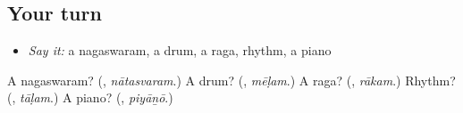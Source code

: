 \subsection*{Your turn}
\begin{itemize}
\raggedright
  \item \emph{Say it:} a nagaswaram, a drum, a raga, rhythm, a piano
\end{itemize}

\begin{tcolorbox}[breakable,colback=teal!4,colframe=teal!35!black,title={Before you move on}]
A nagaswaram? (\textbf{}, \emph{nātasvaram}.) A drum? (\textbf{}, \emph{mēḷam}.) A raga? (\textbf{}, \emph{rākam}.) Rhythm? (\textbf{}, \emph{tāḷam}.) A piano? (\textbf{}, \emph{piyāṉō}.)
\end{tcolorbox}
